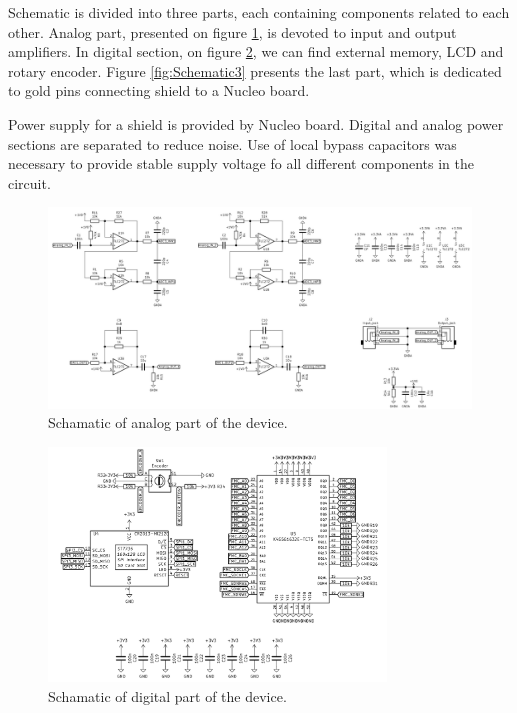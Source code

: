 \documentclass[a4paper,twoside,12pt]{book}
\begin{document}
Schematic is divided into three parts,
each containing components related to each other.
Analog part, presented on figure \ref{fig:Schematic1}, is devoted to input and output amplifiers.
In digital section, on figure \ref{fig:Schematic2}, we can find external memory, LCD and rotary encoder.
Figure \ref{fig:Schematic3} presents the last part,
which is dedicated to gold pins connecting shield to a Nucleo board.

Power supply for a shield is provided by Nucleo board.
Digital and analog power sections are separated to reduce noise.
Use of local bypass capacitors was necessary to provide stable
supply voltage fo all different components in the circuit.

\begin{figure}[H]
    \centering
    \includegraphics[width=\textwidth]{images/Schematic_analog}
    \caption{Schamatic of analog part of the device.}
    \label{fig:Schematic1}
\end{figure}

\begin{figure}[H]
    \centering
    \includegraphics[width=0.8\textwidth]{images/Schematic_digital}
    \caption{Schamatic of digital part of the device.}
    \label{fig:Schematic2}
\end{figure}
\end{document}

